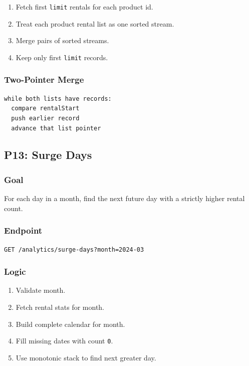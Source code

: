 \documentclass[11pt,a4paper]{article}
\begin{document}
\begin{enumerate}
  \item Fetch first \texttt{limit} rentals for each product id.
  \item Treat each product rental list as one sorted stream.
  \item Merge pairs of sorted streams.
  \item Keep only first \texttt{limit} records.
\end{enumerate}

\subsubsection*{Two-Pointer Merge}

\begin{lstlisting}
while both lists have records:
  compare rentalStart
  push earlier record
  advance that list pointer
\end{lstlisting}

\subsection{P13: Surge Days}

\subsubsection*{Goal}
For each day in a month, find the next future day with a strictly higher rental count.

\subsubsection*{Endpoint}

\begin{lstlisting}
GET /analytics/surge-days?month=2024-03
\end{lstlisting}

\subsubsection*{Logic}

\begin{enumerate}
  \item Validate month.
  \item Fetch rental stats for month.
  \item Build complete calendar for month.
  \item Fill missing dates with count \texttt{0}.
  \item Use monotonic stack to find next greater day.
\end{enumerate}
\end{document}
